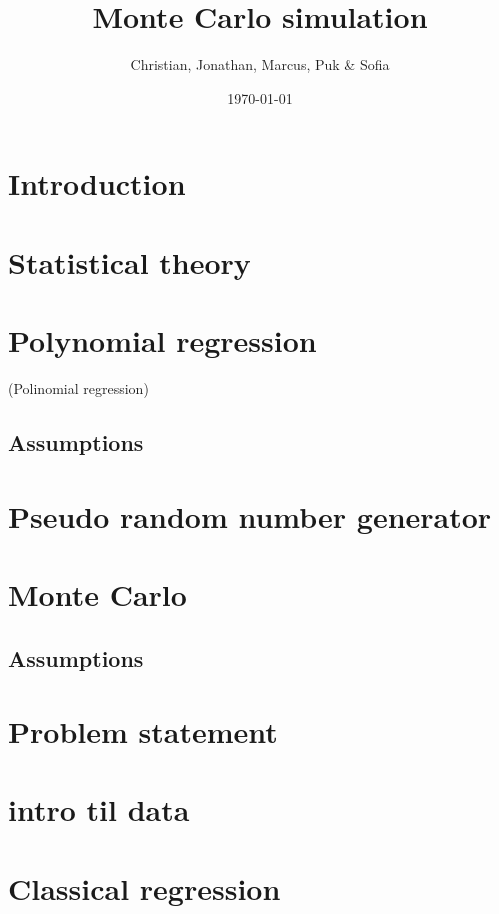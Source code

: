\documentclass{article}
\title{Monte Carlo simulation}
\author{Christian, Jonathan, Marcus, Puk \& Sofia }
\date{\today}
\begin{document}
	
	
	\setcounter{section}{0}
	\maketitle
	\newpage
	\tableofcontents
	\newpage
	
	\section{Introduction}
	
	\newpage
	
	\section{Statistical theory}
	
	\newpage
	
	\section{Polynomial regression}
 	(Polinomial regression)
	\newpage
	
	\subsection{Assumptions}
	\newpage
	
	\section{Pseudo random number generator}
	
	\newpage
	
	\section{Monte Carlo}
	\subsection{Assumptions}
	\newpage
	
	\section{Problem statement}
	\newpage
	\section{intro til data}
	
	\newpage
	\section{Classical regression}
	\newpage
	
\end{document}
